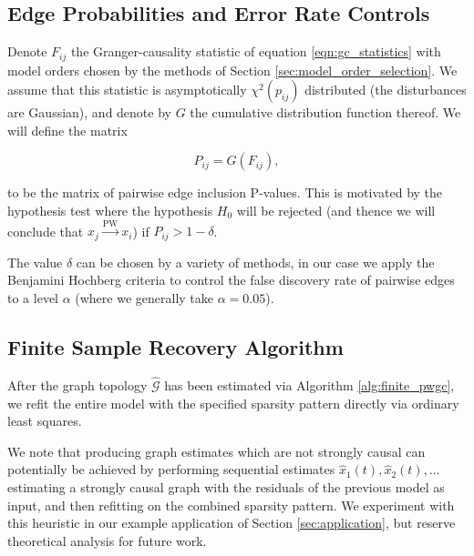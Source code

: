 \documentclass[12pt]{article}
\def\pwgc{\overset{\text{PW}}{\rightarrow}}  %
\def\gcg{\mathcal{G}}  %
\begin{document}
\subsection{Edge Probabilities and Error Rate Controls}
\label{sec:error_rate_control}
Denote $F_{ij}$ the Granger-causality statistic of equation
\ref{eqn:gc_statistics} with model orders chosen by the methods of
Section \ref{sec:model_order_selection}.  We assume that this
statistic is asymptotically $\chi^2(p_{ij})$ distributed (the
disturbances are Gaussian), and denote by $G$ the cumulative
distribution function thereof.  We will define the matrix

\begin{equation}
  \label{eqn:edge_inclusion_probability}
  P_{ij} = G(F_{ij}),
\end{equation}

to be the matrix of pairwise edge inclusion P-values.  This is
motivated by the hypothesis test where the hypothesis $H_0$ will be
rejected (and thence we will conclude that $x_j \pwgc x_i$) if
$P_{ij} > 1 - \delta$.

The value $\delta$ can be chosen by a variety of methods, in our case
we apply the Benjamini Hochberg criteria \cite{benjamini_hochberg}
\cite{all_of_statistics} to control the false discovery rate of
pairwise edges to a level $\alpha$ (where we generally take
$\alpha = 0.05$).

\subsection{Finite Sample Recovery Algorithm}
\label{sec:finite_pwgc}

After the graph topology $\widehat{\gcg}$ has been estimated via
Algorithm \ref{alg:finite_pwgc}, we refit the entire model with the
specified sparsity pattern directly via ordinary least squares.

We note that producing graph estimates which are not strongly causal
can potentially be achieved by performing sequential estimates
$\widehat{x}_1(t), \widehat{x}_2(t), \ldots$ estimating a strongly causal
graph with the residuals of the previous model as input, and then
refitting on the combined sparsity pattern.  We experiment with this
heuristic in our example application of Section \ref{sec:application},
but reserve theoretical analysis for future work.

\clearpage
\printbibliography  
\end{document}
